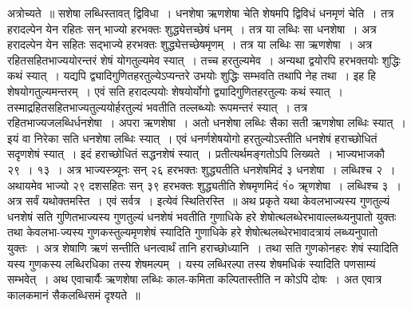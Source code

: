 \documentclass[11pt, openany]{book}
\begin{document}
\vspace{-3mm}
 अत्रोच्यते~॥ सशेषा लब्धिस्तावत् द्विविधा~। धनशेषा ऋणशेषा 
चेति शेषमपि द्विविधं धनमृणं चेति~। तत्र हरादल्पेन येन रहितः 
सन् भाज्यो हरभक्तः शुद्ध्येत्तच्छेषं धनम्~। तत्र या लब्धिः सा 
धनशेषा~। अत्र हरादल्पेन येन सहितः सद्भाज्ये हरभक्तः शुद्ध्येत्तच्छेषमृणम्~। तत्र या लब्धिः सा ऋणशेषा~। अत्र रहितसहितभाज्ययोरन्तरं शेषं योगतुल्यमेव स्यात्~। तच्च हरतुल्यमेव~। अन्यथा द्वयोरपि हरभक्तयोः शुद्धिः कथं स्यात्~। यद्यपि द्व्यादिगुणितहरतुल्येऽप्यन्तरे उभयोः शुद्धिः सम्भवति तथापि नेह तथा~। इह हि शेषयोगतुल्यमन्तरम्~। एवं सति हरादल्पयोः शेषयोर्योगो द्व्यादिगुणितहरतुल्यः कथं स्यात्~। तस्माद्रहितसहितभाज्यतुल्ययोर्हरतुल्यं भवतीति तल्लब्ध्योः रूपमन्तरं स्यात्~। 
तत्र रहितभाज्यजलब्धिर्धनशेषा~। अपरा ऋणशेषा~। अतो धनशेषा लब्धिः 
सैका सती ऋणशेषा लब्धिः स्यात्~। इयं वा निरेका सति धनशेषा 
लब्धिः स्यात्~। एवं धनर्णशेषयोगो हरतुल्योऽस्तीति धनशेषं हराच्छोधितं 
सदृणशेषं स्यात्~। इदं हराच्छोधितं सद्धनशेषं स्यात्~। प्रतीत्यर्थमङ्गतोऽपि
लिख्यते~। भाज्यभाजकौ २९~। १३~। अत्र भाज्यस्त्र्यूनः सन् २६ 
हरभक्तः शुद्ध्यतीति धनशेषमिदं ३ धनशेषा~। लब्धिश्च २~। अथायमेव 
भाज्यो २९ दशसहितः सन् ३९ हरभक्तः शुद्ध्यतीति शेषमृणमिदं १ं० ॠणशेषा~। लब्धिश्च ३~। अत्र सर्वं यथोक्तमस्ति~। एवं सर्वत्र~। इत्येवं स्थितिरस्ति~॥
\newpage
 अथ प्रकृते यथा केवलभाज्यस्य गुणतुल्यं धनशेषं सति गुणितभाज्यस्य गुणतुल्यं धनशेषं भवतीति गुणाधिके हरे शेषोत्थलब्धेरभावाल्लब्ध्यनुपातो युक्तः तथा केवलभा-ज्यस्य गुणकस्तुल्यमृणशेषं स्यादिति गुणाधिके हरे शेषोत्थलब्धेरभावादत्रायं लब्ध्यनुपातो युक्तः~। अत्र शेषाणि ऋणं सन्तीति धनत्वार्थं तानि हराच्छोध्यानि~। तथा सति गुणकोनहरः शेषं स्यादिति यस्य गुणकस्य लब्धिरधिका तस्य शेषमल्पम्~। यस्य लब्धिरल्पा तस्य शेषमधिकं स्यादिति पणसाम्यं सम्भवेत्~। अथ एवाचार्यैः ऋणशेषा लब्धिः काल-कमिता कल्पितास्तीति न कोऽपि दोषः~। अत एवात्र कालकमानं सैकलब्धिसमं दृश्यते~॥ \\
\end{document}
